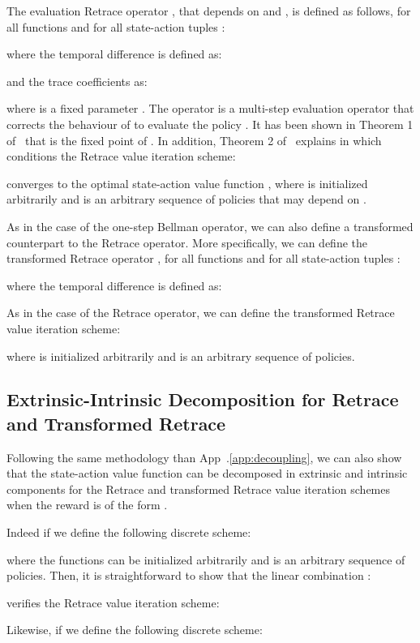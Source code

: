 \documentclass{article}
\begin{document}
The evaluation Retrace operator , that depends on  and , is defined as follows, for all functions  and for all state-action tuples :

where the temporal difference  is defined as:

and the trace coefficients  as:

where  is a fixed parameter .
The operator  is a multi-step evaluation operator that corrects the behaviour of  to evaluate the policy . It has been shown in Theorem 1 of~\citet{munos2016safe} that  is the fixed point of . In addition, Theorem 2 of~\citet{munos2016safe} explains in which conditions the Retrace value iteration scheme:

converges to the optimal state-action value function , where  is initialized arbitrarily and  is an arbitrary sequence of policies that may depend on .

As in the case of the one-step Bellman operator, we can also define a transformed counterpart to the Retrace operator. More specifically, we can define the transformed Retrace operator , for all functions  and for all state-action tuples :

where the temporal difference  is defined as:

As in the case of the Retrace operator, we can define the transformed Retrace value iteration scheme:

where  is initialized arbitrarily and  is an arbitrary sequence of policies.

\subsection{Extrinsic-Intrinsic Decomposition for Retrace and Transformed Retrace}
\label{subsec:decompositionretrace}
Following the same methodology than App~.\ref{app:decoupling}, we can also show that the state-action value function can be decomposed in extrinsic and intrinsic components for the Retrace and transformed Retrace value iteration schemes when the reward is of the form . 

Indeed if we define the following discrete scheme:

where the functions  can be initialized arbitrarily and  is an arbitrary sequence of policies. Then, it is straightforward to show that the linear combination :

verifies the Retrace value iteration scheme:


Likewise, if we define the following discrete scheme:
\end{document}
